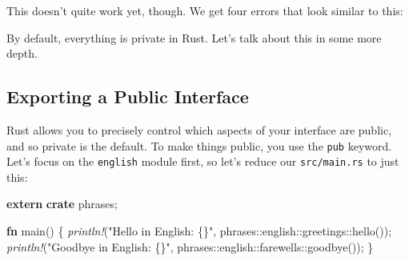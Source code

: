 \documentclass[a4paper,]{book}
\newenvironment{Shaded}{\begin{snugshade}}{\end{snugshade}}
\newcommand{\KeywordTok}[1]{\textcolor[rgb]{0.13,0.29,0.53}{\textbf{{#1}}}}
\newcommand{\StringTok}[1]{\textcolor[rgb]{0.31,0.60,0.02}{{#1}}}
\newcommand{\PreprocessorTok}[1]{\textcolor[rgb]{0.56,0.35,0.01}{\textit{{#1}}}}
\newcommand{\NormalTok}[1]{{#1}}
\begin{document}
This doesn't quite work yet, though. We get four errors that look
similar to this:

\begin{Shaded}
\end{Shaded}

By default, everything is private in Rust. Let's talk about this in some
more depth.

\subsection{Exporting a Public
Interface}\label{exporting-a-public-interface}

Rust allows you to precisely control which aspects of your interface are
public, and so private is the default. To make things public, you use
the \texttt{pub} keyword. Let's focus on the \texttt{english} module
first, so let's reduce our \texttt{src/main.rs} to just this:

\begin{Shaded}
\begin{Highlighting}[]
\KeywordTok{extern} \KeywordTok{crate} \NormalTok{phrases;}

\KeywordTok{fn} \NormalTok{main() \{}
    \PreprocessorTok{println!}\NormalTok{(}\StringTok{"Hello in English: \{\}"}\NormalTok{, phrases::english::greetings::hello());}
    \PreprocessorTok{println!}\NormalTok{(}\StringTok{"Goodbye in English: \{\}"}\NormalTok{, phrases::english::farewells::goodbye());}
\NormalTok{\}}
\end{Highlighting}
\end{Shaded}
\end{document}

